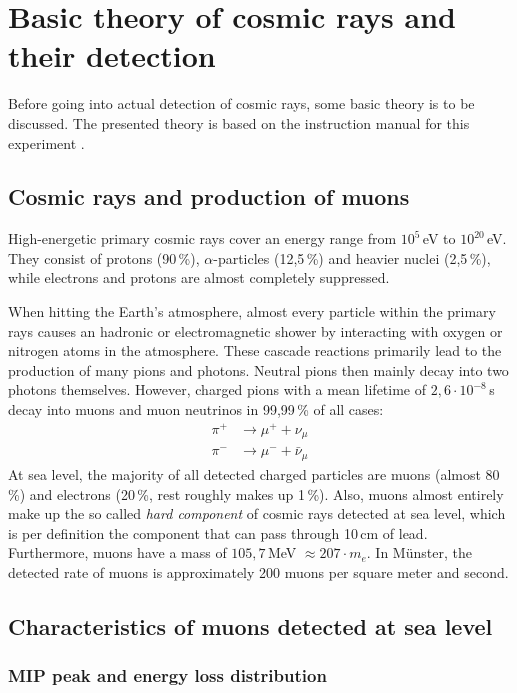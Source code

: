 \section{Basic theory of cosmic rays and their detection}
	
	Before going into actual detection of cosmic rays, some basic theory is to be discussed. The presented theory is based on the instruction manual for this experiment \cite{wwu}.
	

\subsection{Cosmic rays and production of muons}

High-energetic primary cosmic rays cover an energy range from $10^5\,$eV to $10^{20}\,$eV. They consist of protons (90\,\%), $\alpha$-particles (12,5\,\%) and heavier nuclei (2,5\,\%), while electrons and protons are almost completely suppressed.

When hitting the Earth's atmosphere, almost every particle within the primary rays causes an hadronic or electromagnetic shower by interacting with oxygen or nitrogen atoms in the atmosphere. These cascade reactions primarily lead to the production of many pions and photons. Neutral pions then mainly decay into two photons themselves. However, charged pions with a mean lifetime of $2,6\cdot10^{-8}\,$s decay into muons and muon neutrinos in 99,99\,\% of all cases:
\begin{align}
	\pi^+&\longrightarrow \mu^++\nu_\mu\\
	\pi^-&\longrightarrow \mu^-+\bar{\nu}_\mu
\end{align}
At sea level, the majority of all detected charged particles are muons (almost 80\,\%) and electrons (20\,\%, rest roughly makes up 1\,\%). Also, muons almost entirely make up the so called \emph{hard component} of cosmic rays detected at sea level, which is per definition the component that can pass through 10\,cm of lead. Furthermore, muons have a mass of $105,7\,$MeV $\approx207\cdot m_e$. In Münster, the detected rate of muons is approximately 200 muons per square meter and second. 

\subsection{Characteristics of muons detected at sea level}

\subsubsection{MIP peak and energy loss distribution}

